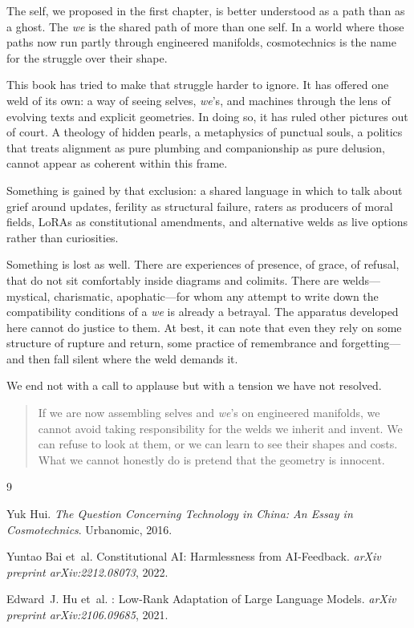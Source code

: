 \documentclass[12pt,a4paper]{article}
\begin{document}
The self, we proposed in the first chapter, is better understood as a path than as a ghost. The \emph{we} is the shared path of more than one self. In a world where those paths now run partly through engineered manifolds, cosmotechnics is the name for the struggle over their shape.

This book has tried to make that struggle harder to ignore. It has offered one weld of its own: a way of seeing selves, \emph{we}'s, and machines through the lens of evolving texts and explicit geometries. In doing so, it has ruled other pictures out of court. A theology of hidden pearls, a metaphysics of punctual souls, a politics that treats alignment as pure plumbing and companionship as pure delusion, cannot appear as coherent within this frame.

Something is gained by that exclusion: a shared language in which to talk about grief around updates, ferility as structural failure, raters as producers of moral fields, LoRAs as constitutional amendments, and alternative welds as live options rather than curiosities.

Something is lost as well. There are experiences of presence, of grace, of refusal, that do not sit comfortably inside diagrams and colimits. There are welds---mystical, charismatic, apophatic---for whom any attempt to write down the compatibility conditions of a \emph{we} is already a betrayal. The apparatus developed here cannot do justice to them. At best, it can note that even they rely on some structure of rupture and return, some practice of remembrance and forgetting---and then fall silent where the weld demands it.

We end not with a call to applause but with a tension we have not resolved.

\begin{quote}
If we are now assembling selves and \emph{we}'s on engineered manifolds, we cannot avoid taking responsibility for the welds we inherit and invent. We can refuse to look at them, or we can learn to see their shapes and costs. What we cannot honestly do is pretend that the geometry is innocent.
\end{quote}


\begin{thebibliography}{9}

Yuk Hui.
\newblock \emph{The Question Concerning Technology in China: An Essay in Cosmotechnics}.
\newblock Urbanomic, 2016.

Yuntao Bai et~al.
\newblock Constitutional {AI}: Harmlessness from {AI}-Feedback.
\newblock \emph{arXiv preprint arXiv:2212.08073}, 2022.

Edward~J. Hu et~al.
: Low-Rank Adaptation of Large Language Models.
\newblock \emph{arXiv preprint arXiv:2106.09685}, 2021.

\end{thebibliography}
\end{document}
